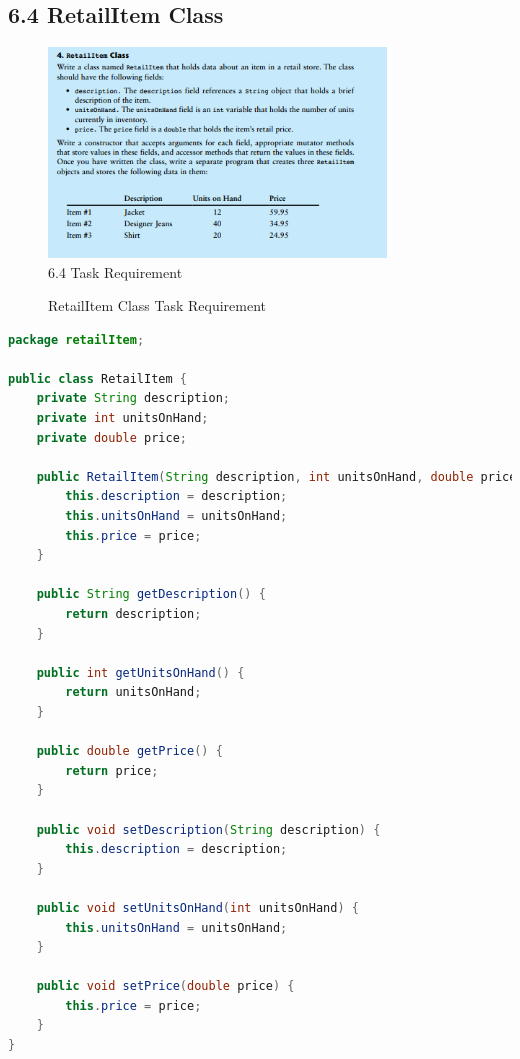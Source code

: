 \documentclass{article}
\begin{document}
\subsection*{6.4 RetailItem Class}
\begin{figure}[H]
    \centering
    \includegraphics[width=0.8\textwidth]{./Assets/Task requirements/Assignment6/6.4.png}
   
    \caption{6.4 Task Requirement}
\end{figure}

\begin{figure}[h]
    \centering
    \caption{RetailItem Class Task Requirement}
\end{figure}

\begin{lstlisting}[language=Java, caption=RetailItem.java]
package retailItem;

public class RetailItem {
    private String description;
    private int unitsOnHand;
    private double price;

    public RetailItem(String description, int unitsOnHand, double price) {
        this.description = description;
        this.unitsOnHand = unitsOnHand;
        this.price = price;
    }

    public String getDescription() {
        return description;
    }

    public int getUnitsOnHand() {
        return unitsOnHand;
    }

    public double getPrice() {
        return price;
    }

    public void setDescription(String description) {
        this.description = description;
    }

    public void setUnitsOnHand(int unitsOnHand) {
        this.unitsOnHand = unitsOnHand;
    }

    public void setPrice(double price) {
        this.price = price;
    }
}

\end{lstlisting}
\end{document}
